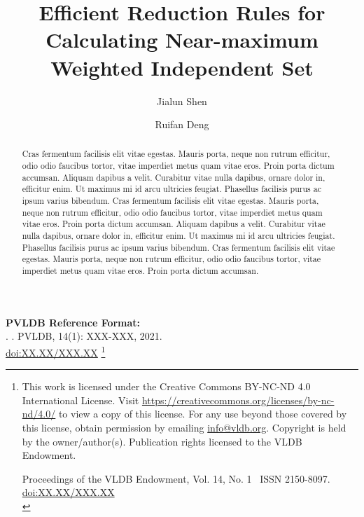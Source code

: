 \documentclass[sigconf, nonacm]{acmart}
\newcommand\vldbdoi{XX.XX/XXX.XX}{}
\newcommand\vldbpages{XXX-XXX}
\newcommand\vldbvolume{14}
\newcommand\vldbissue{1}
\newcommand\vldbyear{2021}
\newcommand\vldbauthors{\authors}
\newcommand\vldbtitle{\shorttitle}
\newcommand\vldbpagestyle{plain}
\begin{document}
\title{Efficient Reduction Rules for Calculating Near-maximum Weighted Independent Set}

\author{Jialun Shen}
\author{Ruifan Deng}

\begin{abstract}
Cras fermentum facilisis elit vitae egestas. Mauris porta, neque non rutrum efficitur, odio odio faucibus tortor, vitae imperdiet metus quam vitae eros. Proin porta dictum accumsan. Aliquam dapibus a velit. Curabitur vitae nulla dapibus, ornare dolor in, efficitur enim. Ut maximus mi id arcu ultricies feugiat. Phasellus facilisis purus ac ipsum varius bibendum.
Cras fermentum facilisis elit vitae egestas. Mauris porta, neque non rutrum efficitur, odio odio faucibus tortor, vitae imperdiet metus quam vitae eros. Proin porta dictum accumsan. Aliquam dapibus a velit. Curabitur vitae nulla dapibus, ornare dolor in, efficitur enim. Ut maximus mi id arcu ultricies feugiat. Phasellus facilisis purus ac ipsum varius bibendum.
Cras fermentum facilisis elit vitae egestas. Mauris porta, neque non rutrum efficitur, odio odio faucibus tortor, vitae imperdiet metus quam vitae eros. Proin porta dictum accumsan. 
\end{abstract}

\maketitle

\pagestyle{\vldbpagestyle}
\begingroup\small\noindent\raggedright\textbf{PVLDB Reference Format:}\\
\vldbauthors. \vldbtitle. PVLDB, \vldbvolume(\vldbissue): \vldbpages, \vldbyear.\\
\href{https://doi.org/\vldbdoi}{doi:\vldbdoi}
\endgroup
\begingroup
\renewcommand\thefootnote{}\footnote{\noindent
This work is licensed under the Creative Commons BY-NC-ND 4.0 International License. Visit \url{https://creativecommons.org/licenses/by-nc-nd/4.0/} to view a copy of this license. For any use beyond those covered by this license, obtain permission by emailing \href{mailto:info@vldb.org}{info@vldb.org}. Copyright is held by the owner/author(s). Publication rights licensed to the VLDB Endowment. \\
\raggedright Proceedings of the VLDB Endowment, Vol. \vldbvolume, No. \vldbissue\ %
ISSN 2150-8097. \\
\href{https://doi.org/\vldbdoi}{doi:\vldbdoi} \\
}\addtocounter{footnote}{-1}\endgroup
\end{document}
